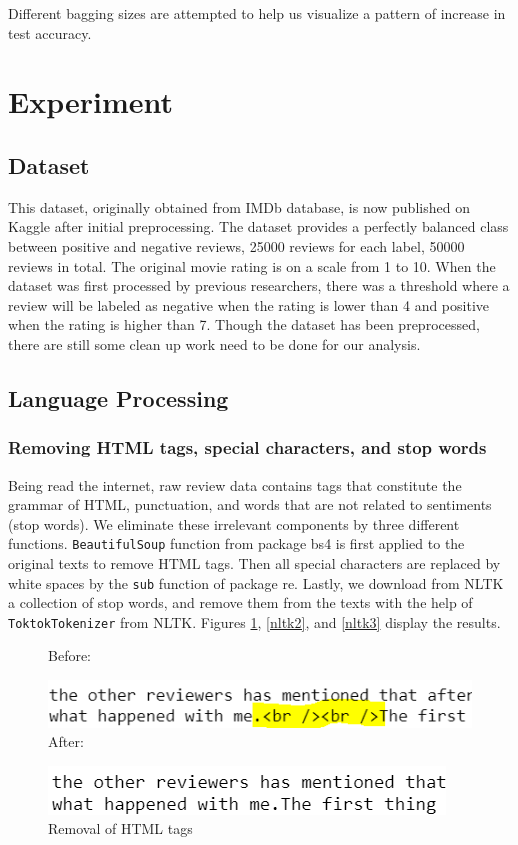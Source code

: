 \documentclass[10pt,twocolumn,letterpaper]{article}
\begin{document}
	Different bagging sizes are attempted to help us visualize a pattern of increase in test accuracy. 
	\section{Experiment}	
	\subsection{Dataset}
	This dataset, originally obtained from IMDb database, is now published on Kaggle after initial preprocessing. The dataset provides a perfectly balanced class between positive and negative reviews, 25000 reviews for each label, 50000 reviews in total. The original movie rating is on a scale from 1 to 10. When the dataset was first processed by previous researchers, there was a threshold where a review will be labeled as negative when the rating is lower than 4 and positive when the rating is higher than 7. Though the dataset has been preprocessed, there are still some clean up work need to be done for our analysis.
	\subsection{Language Processing}
	\subsubsection{Removing HTML tags, special characters, and stop words}
	Being read the internet, raw review data contains tags that constitute the grammar of HTML, punctuation, and words that are not related to sentiments (stop words). We eliminate these irrelevant components by three different functions. \texttt{BeautifulSoup} function from package bs4 is first applied to the original texts to remove HTML tags. Then all special characters are replaced by white spaces by the \texttt{sub} function of package re. Lastly, we download from NLTK a collection of stop words, and remove them from the texts with the help of \texttt{ToktokTokenizer} from NLTK. Figures \ref{nltk1}, \ref{nltk2}, and \ref{nltk3} display the results.
	
	\begin{figure}[H]
		\textsf{Before:}
		
		\includegraphics[width = \columnwidth]{html_tag}
		\textsf{After:}
		
		\includegraphics[width = \columnwidth]{html_tag_removed}
		\caption{Removal of HTML tags}\label{nltk1}
	\end{figure}
	
\end{document}
